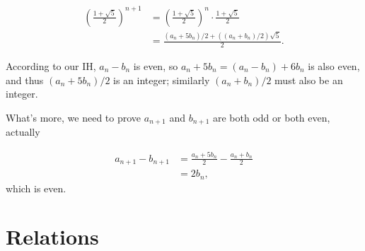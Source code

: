 \documentclass[12pt]{article}
\begin{document}
\begin{equation*}
\begin{aligned}
	\left(\frac{1+\sqrt{5}}{2}\right)^{n+1} & = 
	\left(\frac{1+\sqrt{5}}{2}\right)^n \cdot \frac{1+\sqrt{5}}{2} \\
	& = \frac{(a_n+5 b_n)/2 + ((a_n+b_n)/2) \sqrt{5}}{2}.
\end{aligned}
\end{equation*}

According to our IH, $a_n -b_n$ is even, so $a_n + 5b_n = (a_n-b_n)+6b_n$ is also even,
and thus $(a_n + 5b_n)/2$ is an integer; similarly $(a_n+b_n)/2$ must also be an integer.

What's more, we need to prove $a_{n+1}$ and $b_{n+1}$ are both odd or both even, actually

\begin{equation*}
\begin{aligned}
	a_{n+1} - b_{n+1} &= \frac{a_n + 5b_n}{2 } - \frac{a_n + b_n}{2} \\
	& = 2b_n,
\end{aligned}
\end{equation*}
which is even.

\section{Relations}
\end{document}
